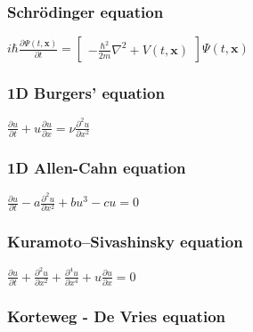 \subsubsection*{Schrödinger equation}

$i \hbar \frac{\partial \Psi(t, \bm{x})}{\partial t} = \begin{bmatrix} - \frac{\hbar^2}{2 m} \nabla^2 + V(t, \bm{x}) \end{bmatrix} \Psi(t, \bm{x})$

\subsubsection*{1D Burgers' equation}


$\frac{\partial u}{\partial t} + u \frac{\partial u}{\partial x} = \nu \frac{\partial^2 u}{\partial x^2}$

\subsubsection*{1D Allen-Cahn equation}


$\frac{\partial u}{\partial t} - a \frac{\partial^2 u}{\partial x^2} + b u^3 - c u = 0$

\subsubsection*{Kuramoto–Sivashinsky equation}



$\frac{\partial u}{\partial t} + \frac{\partial^2 u}{\partial x^2} + \frac{\partial^4 u}{\partial x^4} + u \frac{\partial u}{\partial x} = 0$

\subsubsection*{Korteweg - De Vries equation}

